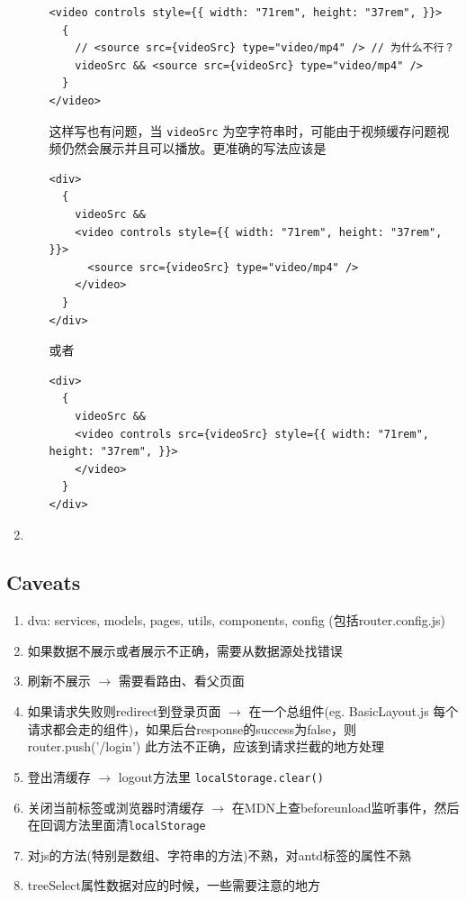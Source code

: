 \documentclass[a4paper, 12pt]{article}
\begin{document}
\begin{enumerate}
\begin{itemize}
\begin{verbatim}
<video controls style={{ width: "71rem", height: "37rem", }}>
  {
    // <source src={videoSrc} type="video/mp4" /> // 为什么不行？
    videoSrc && <source src={videoSrc} type="video/mp4" />
  }
</video>
\end{verbatim}
这样写也有问题，当 \verb|videoSrc| 为空字符串时，可能由于视频缓存问题视频仍然会展示并且可以播放。更准确的写法应该是
\begin{verbatim}
<div>
  {
    videoSrc &&
    <video controls style={{ width: "71rem", height: "37rem", }}>
      <source src={videoSrc} type="video/mp4" />
    </video>
  }
</div>
\end{verbatim}
或者
\begin{verbatim}
<div>
  {
    videoSrc &&
    <video controls src={videoSrc} style={{ width: "71rem", height: "37rem", }}>
    </video>
  }
</div>
\end{verbatim}

\end{itemize}

\item 

\end{enumerate}

\subsection{Caveats}
\begin{enumerate}
\item dva: services, models, pages, utils, components, config (包括router.config.js)

\item 如果数据不展示或者展示不正确，需要从数据源处找错误

\item 刷新不展示 $\rightarrow$ 需要看路由、看父页面

\item 如果请求失败则redirect到登录页面 $\rightarrow$ 在一个总组件(eg. BasicLayout.js 每个请求都会走的组件)，如果后台response的success为false，则router.push('/login') {\color{red}此方法不正确，应该到请求拦截的地方处理}

\item 登出清缓存 $\rightarrow$ logout方法里 \verb|localStorage.clear()|

\item 关闭当前标签或浏览器时清缓存 $\rightarrow$ 在MDN上查beforeunload监听事件，然后在回调方法里面清\verb|localStorage| 

\item 对js的方法(特别是数组、字符串的方法)不熟，对antd标签的属性不熟

\item treeSelect属性数据对应的时候，一些需要注意的地方

\end{enumerate}
\end{document}

